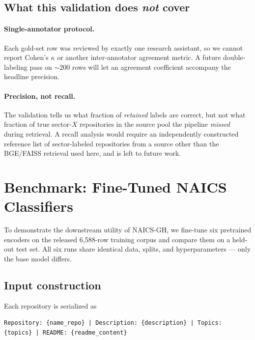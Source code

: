 \documentclass{article}
\begin{document}
\subsection{What this validation does \emph{not} cover}
\label{sec:val:notcover}

\paragraph{Single-annotator protocol.} Each gold-set row was reviewed
by exactly one research assistant, so we cannot report Cohen's
$\kappa$ or another inter-annotator agreement metric. A future
double-labeling pass on $\sim 200$ rows will let an agreement
coefficient accompany the headline precision.

\paragraph{Precision, not recall.} The validation tells us what
fraction of \emph{retained} labels are correct, but not what fraction
of true sector-$X$ repositories in the source pool the pipeline
\emph{missed} during retrieval. A recall analysis would require an
independently constructed reference list of sector-labeled
repositories from a source other than the BGE/FAISS retrieval used
here, and is left to future work.

\section{Benchmark: Fine-Tuned NAICS Classifiers}
\label{sec:benchmark}

To demonstrate the downstream utility of NAICS-GH, we fine-tune six
pretrained encoders on the released 6{,}588-row training corpus and
compare them on a held-out test set. All six runs share identical
data, splits, and hyperparameters --- only the base model differs.

\subsection{Input construction}

Each repository is serialized as

\begin{center}
\small
\texttt{Repository: \{name\_repo\} | Description: \{description\} | Topics: \{topics\} | README: \{readme\_content\}}
\end{center}
\end{document}
